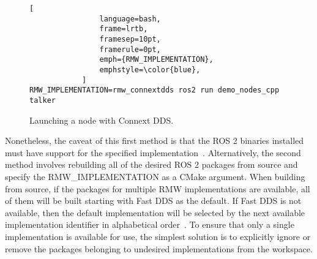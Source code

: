     \begin{figure}[thbp]
        \centering
            \begin{lstlisting}[
                language=bash,
                frame=lrtb,
                framesep=10pt,
                framerule=0pt,
                emph={RMW_IMPLEMENTATION},
                emphstyle=\color{blue},
            ]
RMW_IMPLEMENTATION=rmw_connextdds ros2 run demo_nodes_cpp talker
\end{lstlisting}
        \caption{Launching a node with Connext \ac{DDS}.}
        \label{fig:envrmw}
    \end{figure}

    Nonetheless, the caveat of this first method is that the \ac{ROS} 2 binaries installed must have support for the specified implementation~\cite{subrmw}. Alternatively, the second method involves rebuilding all of the desired \ac{ROS} 2 packages from source and specify the \small\textsf{RMW\_IMPLEMENTATION} as a CMake argument. When building from source, if the packages for multiple \ac{RMW} implementations are available, all of them will be built starting with Fast \ac{DDS} as the default. If Fast \ac{DDS} is not available, then the default implementation will be selected by the next available implementation identifier in alphabetical order~\cite{docsdds}. To ensure that only a single implementation is available for use, the simplest solution is to explicitly ignore or remove the packages belonging to undesired implementations from the workspace.
